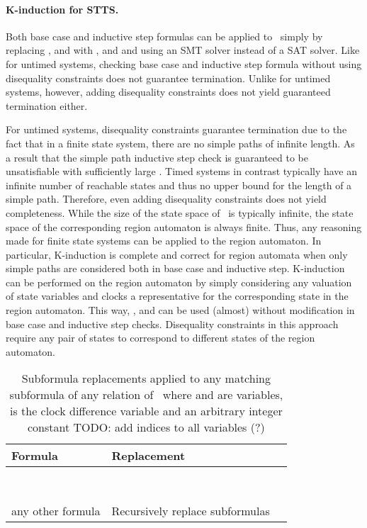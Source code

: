 \paragraph{K-induction for STTS.} Both base case and inductive step formulas can be applied to \aExpsttsTerm\  simply by replacing ,  and  with ,  and  and using an SMT solver instead of a SAT solver. Like for untimed systems, checking base case and inductive step formula without using disequality constraints does not guarantee termination. Unlike for untimed systems, however, adding disequality constraints does not yield guaranteed termination either.

For untimed systems, disequality constraints guarantee termination due to the fact that in a finite state system, there are no simple paths of infinite length. As a result that the simple path inductive step check is guaranteed to be unsatisfiable with sufficiently large  \tocite. Timed systems in contrast typically have an infinite number of reachable states and thus no upper bound for the length of a simple path. Therefore, even adding disequality constraints does not yield completeness.
While the size of the state space of \aExpsttsTerm\ is typically infinite, the state space of the corresponding region automaton is always finite. Thus, any reasoning made for finite state systems can be applied to the region automaton. In particular, K-induction is complete and correct for region automata when only simple paths are considered both in base case and inductive step.
K-induction can be performed on the region automaton by simply considering any valuation of state variables and clocks a representative for the corresponding state in the region automaton. This way, ,  and  can be used (almost) without modification in base case and inductive step checks. Disequality constraints in this approach require any pair of states to correspond to different states of the region automaton.

\begin{table}[tp]
  \caption{Subformula replacements applied to any matching subformula of any relation of \aExpsttsTerm\ where  and  are variables,  is the clock difference variable and  an arbitrary integer constant TODO: add indices to all variables (?)}
  \label{t:int_frac_replacements}
  \begin{center}
  \begin{tabularx}{\textwidth}{| l | X | r|}
  	\hline
  	Formula & Replacement \\
  	\hline
  	\hline
  	 &  \\
  	\hline
  	 &  \\
  	\hline
  	 &  \\
  	\hline
  	 &  \\
  	\hline
  	 &  \\
  	\hline
  	 &  \\
  	\hline
  	 &  \\
  	\hline
  	 & \\
  	\hline
  	any other formula & Recursively replace subformulas \\
  	\hline
  \end{tabularx}
  \end{center}
\end{table}

